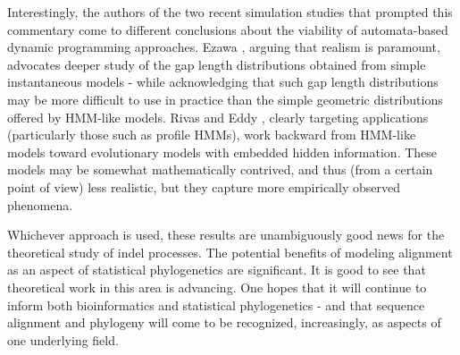 \documentclass{bmcart}
\begin{document}
Interestingly, the authors of the two recent simulation studies that prompted this commentary
come to different conclusions about the viability of automata-based dynamic programming approaches.
Ezawa \cite{Ezawa2016a,Ezawa2016b}, arguing that realism is paramount, advocates deeper study of the
gap length distributions obtained from simple instantaneous models - while acknowledging that such gap length distributions
may be more difficult to use in practice than the simple geometric distributions offered by HMM-like models.
Rivas and Eddy \cite{RivasEddy2015}, clearly targeting applications (particularly those such as profile HMMs),
work backward from HMM-like models toward evolutionary models with embedded
hidden information.
These models may be somewhat mathematically contrived, and thus (from a certain point of view) less realistic,
but they capture more empirically observed phenomena.

Whichever approach is used, these results are unambiguously good news for the theoretical study of indel processes.
The potential benefits of modeling alignment as an aspect of
statistical phylogenetics are significant. It is good to see that theoretical work in this area
is advancing. One hopes that it will continue to inform both bioinformatics and statistical phylogenetics -
and that sequence alignment and phylogeny will come to be recognized, increasingly, as aspects of one underlying field.



\end{document}
